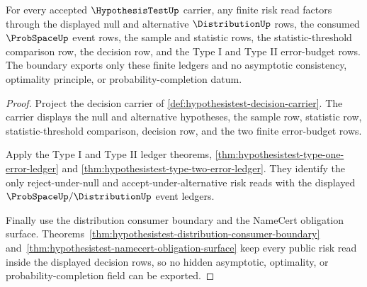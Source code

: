 \begin{theorem}
\label{thm:hypothesis-test-finite-risk-boundary}
For every accepted $\HypothesisTestUp$ carrier, any finite risk read factors
through the displayed null and alternative $\DistributionUp$ rows, the
consumed $\ProbSpaceUp$ event rows, the sample and statistic rows, the
statistic-threshold comparison row, the decision row, and the Type I and Type
II error-budget rows. The boundary exports only these finite ledgers and no
asymptotic consistency, optimality principle, or probability-completion datum.
\end{theorem}
\begin{proof}
Project the decision carrier of
\autoref{def:hypothesistest-decision-carrier}. The carrier displays the null
and alternative hypotheses, the sample row, statistic row,
statistic-threshold comparison, decision row, and the two finite
error-budget rows.

Apply the Type I and Type II ledger theorems,
\autoref{thm:hypothesistest-type-one-error-ledger} and
\autoref{thm:hypothesistest-type-two-error-ledger}. They identify the only
reject-under-null and accept-under-alternative risk reads with the displayed
$\ProbSpaceUp/\DistributionUp$ event ledgers.

Finally use the distribution consumer boundary and the NameCert obligation
surface. Theorems~\ref{thm:hypothesistest-distribution-consumer-boundary}
and~\ref{thm:hypothesistest-namecert-obligation-surface} keep every public
risk read inside the displayed decision rows, so no hidden asymptotic,
optimality, or probability-completion field can be exported.
\end{proof}

